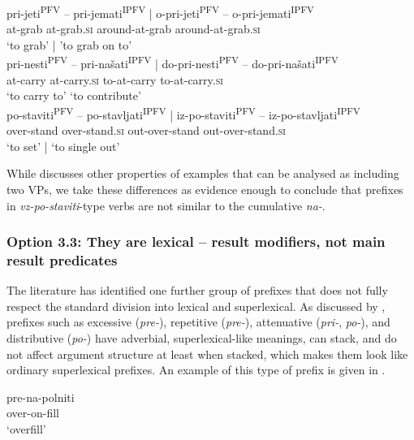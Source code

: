 \documentclass[output=paper,colorlinks,citecolor=brown]{langscibook}
\begin{document}
\ea \label{ex:nedovrsnostdvojnih}
\ea \glll pri-jeti\textsuperscript{PFV} -- pri-jemati\textsuperscript{IPFV}  | o-pri-jeti\textsuperscript{PFV} -- o-pri-jemati\textsuperscript{IPFV}\\
{at}-grab {} {at}-grab.\textsc{si} {}	{around}-{at}-grab {}	{around}-{at}-grab.\textsc{si}\\ 
{`to grab'} {} {} | {'to grab on to'} {} {}\\
\ex \glll pri-nesti\textsuperscript{PFV} -- pri-našati\textsuperscript{IPFV} | do-pri-nesti\textsuperscript{PFV} -- do-pri-našati\textsuperscript{IPFV} \\
{at}-carry {} {at}-carry.\textsc{si} {} {to}-{at}-carry {} {to}-{at}-carry.\textsc{si}\\ 
{`to carry to'} {} {} {} {`to contribute'} {} {}\\
\ex \glll po-staviti\textsuperscript{PFV} -- po-stavljati\textsuperscript{IPFV} | iz-po-staviti\textsuperscript{PFV} -- iz-po-stavljati\textsuperscript{IPFV} \\
{over}-stand {} {over}-stand.\textsc{si} {} {out}-{over}-stand {} {out}-{over}-stand.\textsc{si}\\ 
{`to set'} {} {} | {`to single out'} {} {}\\
\z
\z

\noindent While  \citet{zaucer2009vp} discusses other properties of examples that can be analysed as including two VPs, we take these differences as evidence enough to conclude that prefixes in \textit{vz-po-staviti}-type verbs are not similar to the cumulative \textit{na-}.
      

\subsubsection{Option 3.3: They are lexical -- result modifiers, not main result predicates}\label{sec:resultmodifier}
The literature has identified one further group of prefixes that does not fully respect the standard division into lexical and superlexical. As discussed by \citet{zaucer2013}, prefixes such as excessive (\textit{pre-}), repetitive (\textit{pre-}), attenuative (\textit{pri-}, \textit{po-}), and distributive (\textit{po-}) have adverbial, superlexical-like meanings, can stack, and do not affect argument structure at least when stacked, which makes them look like ordinary superlexical prefixes. An example of this type of prefix is given in .

\ea \gll pre-na-polniti\\
{over}-{on}-fill\\
\glt `overfill’ \label{ex:prefix_pre}
\z
\end{document}
